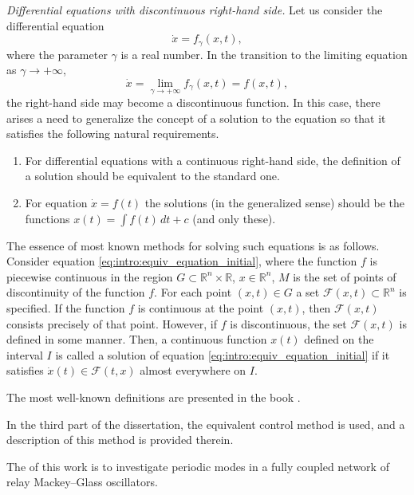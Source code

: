 \textit{Differential equations with discontinuous right-hand side.} Let us consider the differential equation
\[
\dot{x} = f_{\gamma}(x, t),
\]
where the parameter $\gamma$ is a real number. In the transition to the limiting equation as $\gamma \to +\infty$,
\begin{equation}
	\label{eq:intro:equiv_equation_initial}
	\dot{x} = \lim\limits_{\gamma \to +\infty}f_{\gamma}(x, t) = f(x, t),
\end{equation}
the right-hand side may become a discontinuous function. In this case, there arises a need to generalize the concept of a solution to the equation so that it satisfies the following natural requirements.
\begin{enumerate}
	\item For differential equations with a continuous right-hand side, the definition of a solution should be equivalent to the standard one.
	\item For equation $\dot{x} = f(t)$ the solutions (in the generalized sense) should be the functions $x(t) = \int f(t)\, dt + c$ (and only these).
\end{enumerate}
The essence of most known methods for solving such equations is as follows. Consider equation \eqref{eq:intro:equiv_equation_initial}, where the function $f$ is piecewise continuous in the region $G \subset \mathbb{R}^n \times \mathbb{R}$, $x \in \mathbb{R}^n$, $M$ is the set of points of discontinuity of the function $f$. For each point $(x, t) \in G$ a set $\mathcal{F}(x, t) \subset \mathbb{R}^n$ is specified. If the function $f$ is continuous at the point $(x, t)$, then $\mathcal{F}(x, t)$ consists precisely of that point. However, if $f$ is discontinuous, the set  $\mathcal{F}(x, t)$ is defined in some manner. Then, a continuous function $x(t)$ defined on the interval $I$ is called a solution of equation \eqref{eq:intro:equiv_equation_initial} if it satisfies $\dot{x}(t) \in \mathcal{F}(t, x)$ almost everywhere on $I$.

The most well-known definitions are presented in the book \cite[\S 4]{Filippov1988}.

In the third part of the dissertation, the equivalent control method \cite{Utkin1981} is used, and a description of this method is provided therein.

\bigskip

The {\aim} of this work is to investigate periodic modes in a fully coupled network of relay Mackey--Glass oscillators.

